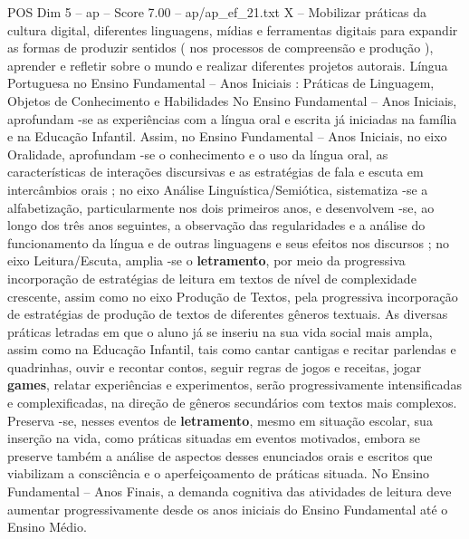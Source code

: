 \begin{textsample}{POS Dim 5 – ap – Score 7.00 – ap/ap\_ef\_21.txt}
X – Mobilizar práticas da cultura digital, diferentes linguagens, mídias e ferramentas digitais para expandir as formas de produzir sentidos ( nos processos de compreensão e produção ), aprender e refletir sobre o mundo e realizar diferentes projetos autorais.
Língua Portuguesa no Ensino Fundamental – Anos Iniciais : Práticas de Linguagem, Objetos de Conhecimento e Habilidades No Ensino Fundamental – Anos Iniciais, aprofundam -se as experiências com a língua oral e escrita já iniciadas na família e na Educação Infantil.
Assim, no Ensino Fundamental – Anos Iniciais, no eixo Oralidade, aprofundam -se o conhecimento e o uso da língua oral, as características de interações discursivas e as estratégias de fala e escuta em intercâmbios orais ; no eixo Análise Linguística/Semiótica, sistematiza -se a alfabetização, particularmente nos dois primeiros anos, e desenvolvem -se, ao longo dos três anos seguintes, a observação das regularidades e a análise do funcionamento da língua e de outras linguagens e seus efeitos nos discursos ; no eixo Leitura/Escuta, amplia -se o \textbf{letramento}, por meio da progressiva incorporação de estratégias de leitura em textos de nível de complexidade crescente, assim como no eixo Produção de Textos, pela progressiva incorporação de estratégias de produção de textos de diferentes gêneros textuais.
As diversas práticas letradas em que o aluno já se inseriu na sua vida social mais ampla, assim como na Educação Infantil, tais como cantar cantigas e recitar parlendas e quadrinhas, ouvir e recontar contos, seguir regras de jogos e receitas, jogar \textbf{games}, relatar experiências e experimentos, serão progressivamente intensificadas e complexificadas, na direção de gêneros secundários com textos mais complexos.
Preserva -se, nesses eventos de \textbf{letramento}, mesmo em situação escolar, sua inserção na vida, como práticas situadas em eventos motivados, embora se preserve também a análise de aspectos desses enunciados orais e escritos que viabilizam a consciência e o aperfeiçoamento de práticas situada.
No Ensino Fundamental – Anos Finais, a demanda cognitiva das atividades de leitura deve aumentar progressivamente desde os anos iniciais do Ensino Fundamental até o Ensino Médio.

\end{textsample}
